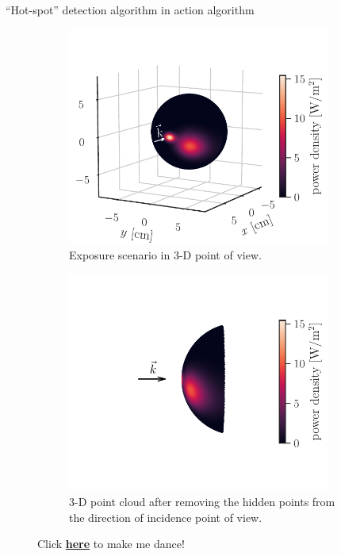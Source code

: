 \documentclass[xcolor=dvipsnames,10pt]{beamer}
\begin{document}
\begin{frame}{``Hot-spot'' detection algorithm in action algorithm}
    \begin{figure}
     \centering
     \begin{subfigure}[b]{0.45\textwidth}
         \centering
         \includegraphics[width=0.95\textwidth]{figures/hotspot-detection-thumbnail.1.pdf}
         \caption{Exposure scenario in 3-D point of view.}
     \end{subfigure}
     \hfill
     \begin{subfigure}[b]{0.45\textwidth}
         \centering
         \includegraphics[width=0.95\textwidth]{figures/hotspot-detection-thumbnail.2.pdf}
         \caption{3-D point cloud after removing the hidden points from the direction of incidence point of view.}
     \end{subfigure}
    \caption{Click \href{https://github.com/akapet00/phd-dissertation-topic/blob/main/artwork/hotspot-detection-animation.gif}{\bf{here}} to make me dance!}    
    \end{figure}
\end{frame}
\end{document}
